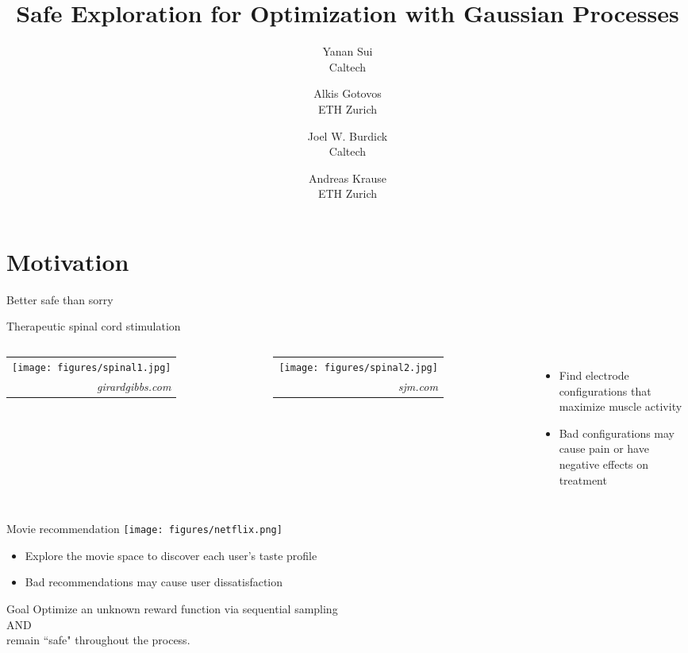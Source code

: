 \documentclass[xetex,10pt,mathserif]{beamer}
\title[Safe Gaussian Process Optimization]
{Safe Exploration for Optimization with Gaussian Processes}
\author[Alkis Gotovos]{
\vspace{1in}
\normalsize
\parbox{1in}{Yanan Sui\\{\footnotesize Caltech}}\and
\parbox{1in}{Alkis Gotovos\\{\footnotesize ETH Zurich}}\and
\parbox{1in}{Joel W. Burdick\\{\footnotesize Caltech}}\and
\parbox{1in}{Andreas Krause\\{\footnotesize ETH Zurich}}
}
\date[May 4, 2015]{
\begin{center}
{\normalsize
ICML '15
}
\end{center}
}
\newcommand{\sig}[2]{%
\begin{tabular}{r}
#1\\[-0.7em]
{\tiny \color{darkgray}\it #2\hspace{0.5em}}
\end{tabular}}
\begin{document}


\section{Motivation}

\begin{frame}{Better safe than sorry}
\end{frame}

\begin{frame}{Therapeutic spinal cord stimulation}
\begin{columns}[c]
\centering
\sig{\texttt{[image: figures/spinal1.jpg]}}{girardgibbs.com}

\centering
\sig{\texttt{[image: figures/spinal2.jpg]}}{sjm.com}
\begin{itemize}
\item Find electrode configurations that maximize muscle activity
\item Bad configurations may cause pain or have negative effects on treatment
\end{itemize}
\end{columns}
\end{frame}

\begin{frame}{Movie recommendation}
\centering
\texttt{[image: figures/netflix.png]}
\vspace{2em}
\begin{itemize}
\item Explore the movie space to discover each user's taste profile
\item Bad recommendations may cause user dissatisfaction
\end{itemize}
\end{frame}

\begin{frame}{Goal}
\centering
\large
Optimize an unknown reward function via sequential sampling\\[1em]
AND\\[1em]
remain ``safe" throughout the process.
\end{frame}
\end{document}
